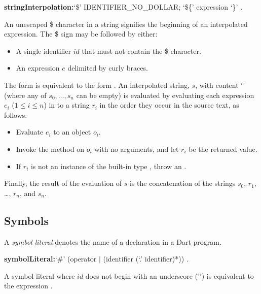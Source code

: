 \documentclass{article}
\begin{document}
\begin{grammar}
{\bf stringInterpolation:}`\$' IDENTIFIER\_NO\_DOLLAR;
  `\$\{' expression `\}'
  .
\end{grammar}


\LMHash{}
An unescaped \$ character in a string signifies the beginning of an interpolated expression.
The \$ sign may be followed by either:
\begin{itemize}
\item A single identifier $id$ that must not contain the \$ character.
\item An expression $e$ delimited by curly braces.
\end{itemize}

\LMHash{}
The form  is equivalent to the form .
An interpolated string, $s$, with content `' (where any of $s_0, \ldots, s_n$ can be empty)
is evaluated by evaluating each expression $e_i$ ($1 \le i \le n$) in to a string $r_i$ in the order they occur in the source text, as follows:
\begin{itemize}
\item{} Evaluate $e_i$ to an object $o_i$.
\item{} Invoke the  method on $o_i$ with no arguments, and let
 $r_i$ be the returned value.
\item{} If $r_i$ is not an instance of the built-in type , throw an .
\end{itemize}
Finally, the result of the evaluation of $s$ is the concatenation of the strings $s_0$, $r_1$, \ldots, $r_n$, and $s_n$.


\subsection{Symbols}

\LMHash{}
A {\em symbol literal} denotes the name of a declaration in a Dart program.

\begin{grammar}
{\bf symbolLiteral:}`\#' (operator $|$ (identifier (`{\escapegrammar .}' identifier)*))
  .
\end{grammar}

\LMHash{}
A symbol literal  where $id$ does not begin with an underscore ('\code{\_}') is equivalent to the expression .
\end{document}
